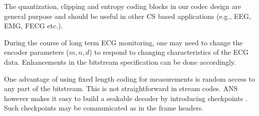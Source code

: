 The quantization, clipping and entropy coding blocks in our
codec design are general purpose and should be useful
in other CS based applications (e.g., EEG, EMG, FECG etc.).

During the course of long term ECG monitoring, one may
need to change the encoder parameters ($m,n,d$) to
respond to changing characteristics of the ECG data.
Enhancements in the bitstream specification can be
done accordingly.

One advantage of using fixed length coding for measurements
is random access to any part of the bitstream.
This is not straightforward in stream codes. ANS however
makes it easy to build a seakable decoder by introducing
checkpoints \cite{bamler2022constriction}. Such checkpoints
may be communicated as in the frame headers. 




